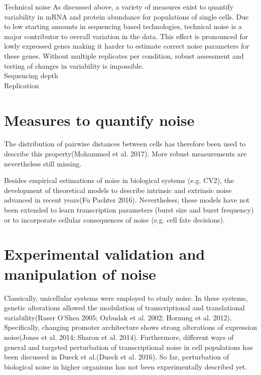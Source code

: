 Technical noise
As discussed above, a variety of measures exist to quantify variability in mRNA and protein abundance for populations of single cells. Due to low starting amounts in sequencing based technologies, technical noise is a major contributor to overall variation in the data. This effect is pronounced for lowly expressed genes making it harder to estimate correct noise parameters for these genes. Without multiple replicates per condition, robust assessment and testing of changes in variability is impossible.\\

Sequencing depth\\
Replication\\

\section{Measures to quantify noise}

 The distribution of pairwise distances between cells has therefore been used to describe this property(Mohammed et al. 2017). More robust measurements are nevertheless still missing.
 
 Besides empirical estimations of noise in biological systems (e.g. CV2), the development of theoretical models to describe intrinsic and extrinsic noise advanced in recent years(Fu Pachter 2016). Nevertheless, these models have not been extended to learn transcription parameters (burst size and burst frequency) or to incorporate cellular consequences of noise (e.g. cell fate decisions).

\section{Experimental validation and manipulation of noise}

Classically, unicellular systems were employed to study noise. In these systems, genetic alterations allowed the modulation of transcriptional and translational variability(Raser O’Shea 2005; Ozbudak et al. 2002; Hornung et al. 2012). Specifically, changing promoter architecture shows strong alterations of expression noise(Jones et al. 2014; Sharon et al. 2014). Furthermore, different ways of general and targeted perturbation of transcriptional noise in cell populations has been discussed in Dueck et al.(Dueck et al. 2016). So far, perturbation of biological noise in higher organisms has not been experimentally described yet.\\


